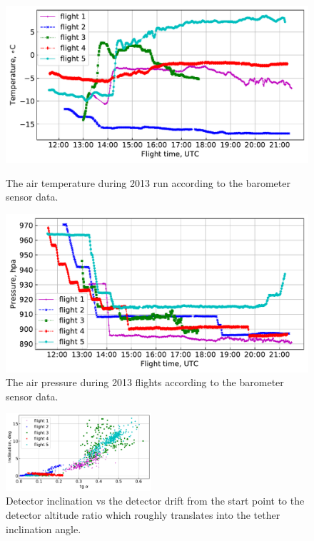 \documentclass[final,5p,times,twocolumn]{elsarticle}
\begin{document}
\begin{figure}[tb]
    \begin{minipage}[t]{0.48\textwidth}
    \centering
    \includegraphics[width=\textwidth]{figs/T1.pdf}
    \caption{The air temperature during 2013 run according to the barometer sensor data.}
    \label{fig:temperature}
    \end{minipage}
    \hfill
    \begin{minipage}[t]{0.48\textwidth}
    \centering
    \includegraphics[width=\textwidth]{figs/P_hpa0.pdf}
    \caption{The air pressure during 2013 flights according to the barometer sensor data.}
    \label{fig:pressure}
    \end{minipage}
\end{figure}


\begin{figure}[tb]
    \includegraphics[width=0.48\textwidth]{figs/tg-inclination.pdf}
    \caption{Detector inclination vs the detector drift from the start point to the detector altitude ratio which roughly translates into the tether inclination angle.}
\label{fig:drift-inclination}
\end{figure}
\end{document}

